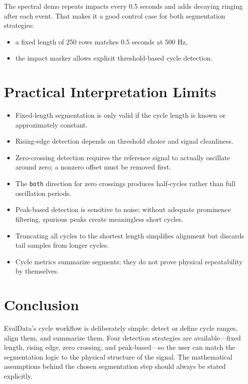 \documentclass[11pt,a4paper]{article}
\begin{document}
The spectral demo repeats impacts every 0.5 seconds and adds decaying ringing after each event. That makes it a good control case for both segmentation strategies:

\begin{itemize}
    \item a fixed length of 250 rows matches 0.5 seconds at 500 Hz,
    \item the impact marker allows explicit threshold-based cycle detection.
\end{itemize}

\section{Practical Interpretation Limits}

\begin{itemize}
    \item Fixed-length segmentation is only valid if the cycle length is known or approximately constant.
    \item Rising-edge detection depends on threshold choice and signal cleanliness.
    \item Zero-crossing detection requires the reference signal to actually oscillate around zero; a nonzero offset must be removed first.
    \item The \texttt{both} direction for zero crossings produces half-cycles rather than full oscillation periods.
    \item Peak-based detection is sensitive to noise; without adequate prominence filtering, spurious peaks create meaningless short cycles.
    \item Truncating all cycles to the shortest length simplifies alignment but discards tail samples from longer cycles.
    \item Cycle metrics summarize segments; they do not prove physical repeatability by themselves.
\end{itemize}

\section{Conclusion}

EvalData's cycle workflow is deliberately simple: detect or define cycle ranges, align them, and summarize them. Four detection strategies are available---fixed length, rising edge, zero crossing, and peak-based---so the user can match the segmentation logic to the physical structure of the signal. The mathematical assumptions behind the chosen segmentation step should always be stated explicitly.
\end{document}
